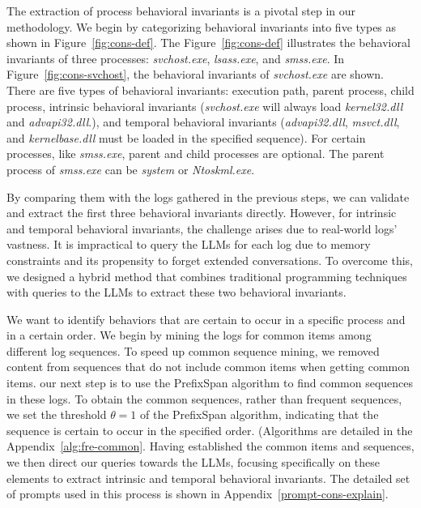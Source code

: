 The extraction of process behavioral invariants is a pivotal step in our methodology. We begin by categorizing behavioral invariants into five types as shown in Figure~\ref{fig:cons-def}.
The Figure~\ref{fig:cons-def} illustrates the behavioral invariants of three processes: \textit{svchost.exe}, \textit{lsass.exe}, and \textit{smss.exe}. In Figure~\ref{fig:cons-svchost}, the behavioral invariants of \textit{svchost.exe} are shown. There are five types of behavioral invariants: execution path, parent process, child process, intrinsic behavioral invariants (\textit{svchost.exe} will always load \textit{kernel32.dll} and \textit{advapi32.dll}.), and temporal behavioral invariants (\textit{advapi32.dll}, \textit{msvct.dll}, and \textit{kernelbase.dll} must be loaded in the specified sequence).
For certain processes, like \textit{smss.exe}, parent and child processes are optional. The parent process of \textit{smss.exe} can be \textit{system} or \textit{Ntoskml.exe}.

By comparing them with the logs gathered in the previous steps, we can validate and extract the first three behavioral invariants directly.
However, for intrinsic and temporal behavioral invariants, the challenge arises due to real-world logs' vastness. It is impractical to query the LLMs for each log due to memory constraints and its propensity to forget extended conversations. To overcome this, we designed a hybrid method that combines traditional programming techniques with queries to the LLMs to extract these two behavioral invariants.

We want to identify behaviors that are certain to occur in a specific process and in a certain order. 
We begin by mining the logs for common items among different log sequences.   
To speed up common sequence mining, we removed content from sequences that do not include common items when getting common items.
our next step is to use the PrefixSpan algorithm to find common sequences in these logs. 
To obtain the common sequences, rather than frequent sequences, we set the threshold \( \theta =1\) of the PrefixSpan algorithm, indicating that the sequence is certain to occur in the specified order.
(Algorithms are detailed in the Appendix~\ref{alg:fre-common}.
Having established the common items and sequences, we then direct our queries towards the LLMs, focusing specifically on these elements to extract intrinsic and temporal behavioral invariants. 
The detailed set of prompts used in this process is shown in Appendix~\ref{prompt-cons-explain}.


